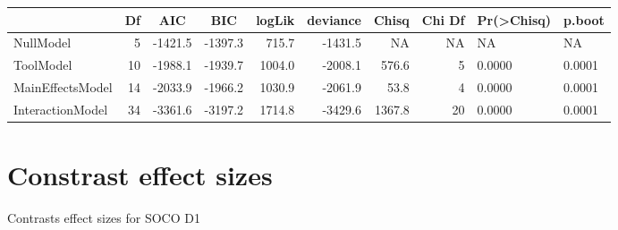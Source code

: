 \documentclass[a4paper, 12pt, oneside, openany, final, pdftex]{book}\usepackage[]{graphicx}\usepackage[]{color}
\begin{document}
\begin{appendices}
\begin{landscape}
\begin{table}
\begin{tabular}{lrrrrrrrll}
\toprule
\multicolumn{1}{c}{\textbf{ }} & \multicolumn{1}{c}{\textbf{Df}} & \multicolumn{1}{c}{\textbf{AIC}} & \multicolumn{1}{c}{\textbf{BIC}} & \multicolumn{1}{c}{\textbf{logLik}} & \multicolumn{1}{c}{\textbf{deviance}} & \multicolumn{1}{c}{\textbf{Chisq}} & \multicolumn{1}{c}{\textbf{Chi Df}} & \multicolumn{1}{c}{\textbf{Pr(>Chisq)}} & \multicolumn{1}{c}{\textbf{p.boot}}\\
\midrule
\rowcolor{gray!6}  NullModel & 5 & -1421.5 & -1397.3 & 715.7 & -1431.5 & NA & NA & NA & NA\\
ToolModel & 10 & -1988.1 & -1939.7 & 1004.0 & -2008.1 & 576.6 & 5 & 0.0000 & 0.0001\\
\rowcolor{gray!6}  MainEffectsModel & 14 & -2033.9 & -1966.2 & 1030.9 & -2061.9 & 53.8 & 4 & 0.0000 & 0.0001\\
InteractionModel & 34 & -3361.6 & -3197.2 & 1714.8 & -3429.6 & 1367.8 & 20 & 0.0000 & 0.0001\\
\bottomrule
\end{tabular}


\end{table}
\end{landscape}
  \chapter{Constrast effect sizes}\label{apx:contrastsEfectSizes}

  

\begin{table}[ht]
  \centering
  \caption{Contrasts effect sizes for SOCO D1}\label{tbl:effectSizesSOCOD1}


\end{table}
\end{appendices}
\end{document}
